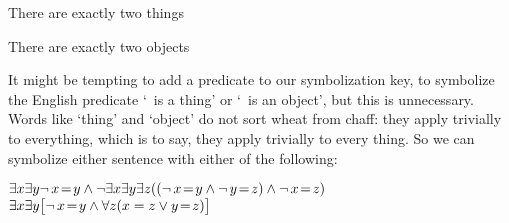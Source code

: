 \begin{earg}
\item[\ex{exactly2things}] There are exactly two things
\item[\ex{exactly2objects}] There are exactly two objects
\end{earg}
It might be tempting to add a predicate to our symbolization key, to symbolize the English predicate `\blank\ is a thing' or `\blank\ is an object', but this is unnecessary. Words like `thing' and `object' do not sort wheat from chaff: they apply trivially to everything, which is to say, they apply trivially to every thing. So we can symbolize either sentence with either of the following:
	\begin{center}
		$\exists x \exists y \enot\, x\eid y \eand \enot \exists x \exists y \exists z ((\enot\, x\eid y \eand \enot\, y\eid z) \eand \enot\, x\eid z)$\\
		
		$\exists x \exists y \bigl[\neg\, x\!=\! y \wedge \forall z(x=z \vee y \!=\! z)\bigr]$
	\end{center}

\practiceproblems




